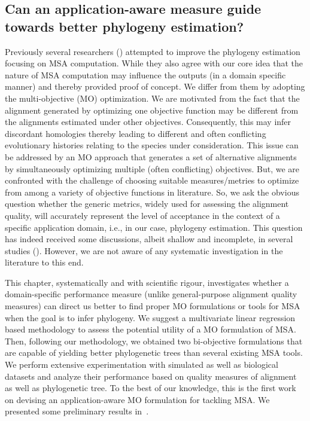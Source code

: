 \subsection{Can an application-aware measure guide towards better
phylogeny estimation?}
Previously several researchers (\citep{redelings2005joint, ashkenazy2018multiple}) attempted to improve the phylogeny estimation focusing on MSA computation. While they also agree with our core idea that the nature of MSA computation may influence the outputs (in a domain specific manner) and thereby provided proof of concept. We differ from them by adopting the multi-objective (MO) optimization.
We are motivated from the fact that the alignment generated by optimizing one objective function may be different from the alignments estimated under other objectives. Consequently, this may infer discordant homologies thereby leading to different and often conflicting evolutionary histories relating to the species under consideration. This issue can be addressed by an MO approach that generates a set of alternative alignments by simultaneously optimizing multiple (often conflicting) objectives. But, we are confronted with the challenge of choosing suitable measures/metries to optimize from among a variety of objective functions in literature.
So, we ask the obvious question whether the generic metrics, widely used for assessing the alignment quality, will accurately represent the level of acceptance in the context of a specific application domain, i.e., in our case, phylogeny estimation.
This question has indeed received some discussions, albeit shallow and incomplete, in several studies (\citep{mirarab2015pasta, liu2009rapid}). However, we are not aware of any systematic investigation in the literature to this end. 



This chapter, systematically and with scientific rigour, investigates whether a domain-specific performance measure (unlike general-purpose alignment quality measures) can direct us better to find proper MO formulations or tools for MSA when the goal is to infer phylogeny. We suggest a multivariate linear regression based methodology to assess the potential utility of a MO formulation of MSA. Then, following our methodology, we obtained two bi-objective formulations that are capable of yielding better phylogenetic trees than several existing MSA tools.
We perform extensive experimentation with simulated as well as biological datasets and analyze their performance based on quality measures of alignment as well as phylogenetic tree. 
To the best of our knowledge, this is the first work on devising an application-aware MO formulation for tackling MSA. We presented some preliminary results in~\cite{nayeem2019phylogeny}.



